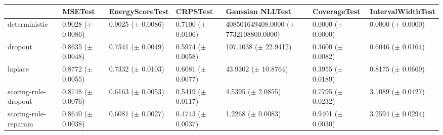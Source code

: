 \begin{tabular}{lllllll}
\toprule
 & MSETest & EnergyScoreTest & CRPSTest & Gaussian NLLTest & CoverageTest & IntervalWidthTest \\
\midrule
deterministic & \makecell{0.9028 \\ ($\pm$ 0.0086)} & \makecell{0.9025 \\ ($\pm$ 0.0086)} & \makecell{0.7100 \\ ($\pm$ 0.0106)} & \makecell{408501649408.0000 \\ ($\pm$ 7732108800.0000)} & \makecell{0.0000 \\ ($\pm$ 0.0000)} & \makecell{0.0000 \\ ($\pm$ 0.0000)} \\
dropout & \makecell{0.8635 \\ ($\pm$ 0.0048)} & \makecell{0.7541 \\ ($\pm$ 0.0049)} & \makecell{0.5974 \\ ($\pm$ 0.0058)} & \makecell{107.1038 \\ ($\pm$ 22.9412)} & \makecell{0.3600 \\ ($\pm$ 0.0082)} & \makecell{0.6046 \\ ($\pm$ 0.0164)} \\
laplace & \makecell{0.8772 \\ ($\pm$ 0.0055)} & \makecell{0.7332 \\ ($\pm$ 0.0103)} & \makecell{0.6081 \\ ($\pm$ 0.0077)} & \makecell{43.9302 \\ ($\pm$ 10.8764)} & \makecell{0.3955 \\ ($\pm$ 0.0189)} & \makecell{0.8175 \\ ($\pm$ 0.0669)} \\
scoring-rule-dropout & \makecell{0.8748 \\ ($\pm$ 0.0076)} & \makecell{0.6163 \\ ($\pm$ 0.0053)} & \makecell{0.5419 \\ ($\pm$ 0.0117)} & \makecell{4.5395 \\ ($\pm$ 2.0855)} & \makecell{0.7795 \\ ($\pm$ 0.0232)} & \makecell{3.1089 \\ ($\pm$ 0.0427)} \\
scoring-rule-reparam & \makecell{0.8640 \\ ($\pm$ 0.0038)} & \makecell{0.6081 \\ ($\pm$ 0.0027)} & \makecell{0.4743 \\ ($\pm$ 0.0037)} & \makecell{1.2268 \\ ($\pm$ 0.0083)} & \makecell{0.9401 \\ ($\pm$ 0.0030)} & \makecell{3.2594 \\ ($\pm$ 0.0294)} \\
\bottomrule
\end{tabular}
